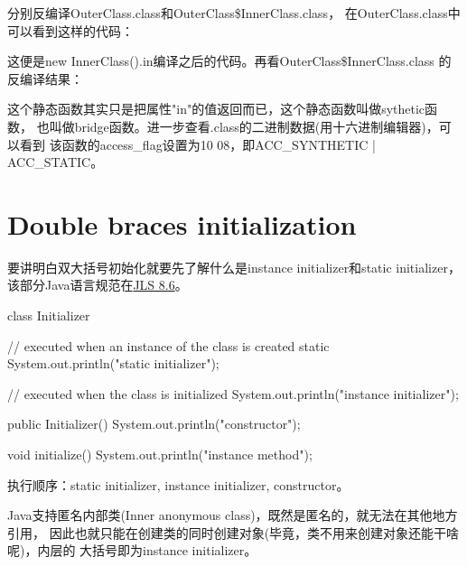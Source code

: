\documentclass[a4paper,11pt]{article}
\begin{document}
分别反编译OuterClass.class和OuterClass\$InnerClass.class，
在OuterClass.class中可以看到这样的代码：


这便是new InnerClass().in编译之后的代码。再看OuterClass\$InnerClass.class
的反编译结果：


这个静态函数其实只是把属性"in"的值返回而已，这个静态函数叫做sythetic函数，
也叫做bridge函数。进一步查看.class的二进制数据(用十六进制编辑器)，可以看到
该函数的access\_flag设置为10 08，即ACC\_SYNTHETIC | ACC\_STATIC。


\section[Double braces initialization]{Double braces initialization}
要讲明白双大括号初始化就要先了解什么是instance initializer和static initializer，
该部分Java语言规范在\href{http://docs.oracle.com/javase/specs/jls/se7/html/jls-8.html#jls-8.6}{JLS 8.6}。

\begin{javacode}
class Initializer {

  // executed when an instance of the class is created
  static {
    System.out.println("static initializer");
  }

  // executed when the class is initialized
  {
    System.out.println("instance initializer");
  }

  public Initializer() {
    System.out.println("constructor");
  }

  void initialize() {
    System.out.println("instance method");
  }
}
\end{javacode}

执行顺序：static initializer, instance initializer, constructor。

Java支持匿名内部类(Inner anonymous class)，既然是匿名的，就无法在其他地方引用，
因此也就只能在创建类的同时创建对象(毕竟，类不用来创建对象还能干啥呢)，内层的
大括号即为instance initializer。
\end{document}
